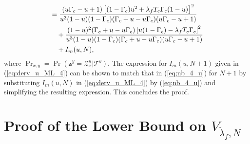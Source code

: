 \documentclass[11pt,draftclsnofoot,journal,onecolumn]{IEEEtran}
\begin{document}
\begin{IEEEproof}
\begin{align}
& = \frac{(u\Gamma_c - u + 1)\left[(1-\Gamma_c)u^2 + \lambda_f T_c\Gamma_c(1-u)\right]^2}{u^3(1-u)(1-\Gamma_c)(\Gamma_c + u - u\Gamma_c)(u\Gamma_c - u + 1)}\notag\\
&\quad +\frac{(1 - u)^2(\Gamma_c + u - u\Gamma_c)\left[u(1-\Gamma_c) - \lambda_f T_c\Gamma_c\right]^2}{u^3(1-u)(1-\Gamma_c)(\Gamma_c + u - u\Gamma_c)(u\Gamma_c - u + 1)}\nonumber\\&\quad+ I_m(u, N),
\label{eq:derv_u_ML_4}
\end{align}
where $\Pr_{x,y}=\Pr(\boldsymbol{z}^{y} = \mathcal{Z}_{x}^{y}|\mathcal{T}^y)$. The expression for $I_m(u, N+1)$ given in (\ref{eq:derv_u_ML_4}) can be shown to match that in (\ref{eq;nb_4_u}) for $N+1$ by substituting $I_m(u, N)$ in (\ref{eq:derv_u_ML_4}) by (\ref{eq;nb_4_u}) and simplifying the resulting expression. This concludes the proof.
\end{IEEEproof}

\section{Proof of the Lower Bound on $V_{\tilde{\lambda}_f,N}$}
\label{sec:math_ind_lf}
\end{document}
